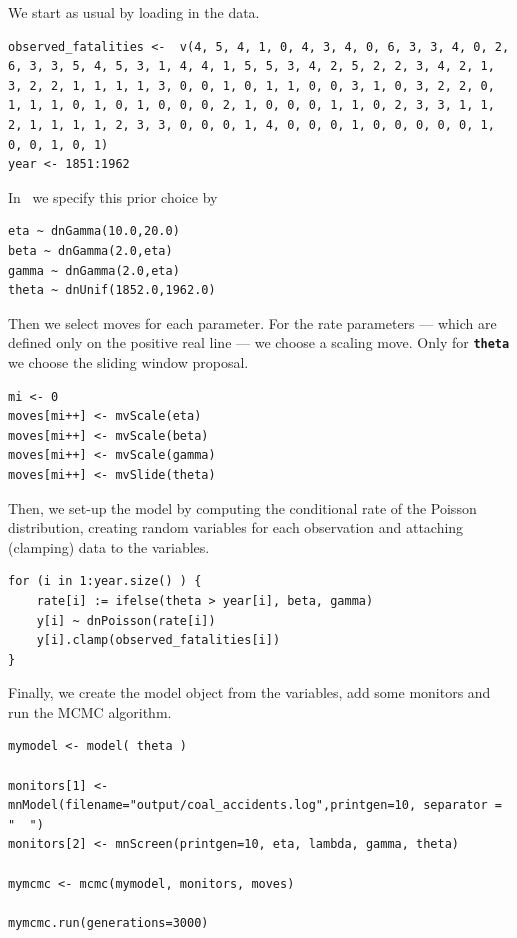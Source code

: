 \documentclass[11pt]{article}
\newcommand{\cl}[1]{{\texttt{\textbf{#1}}}}
\begin{document}
We start as usual by loading in the data.
{\tt \begin{snugshade*}
\begin{lstlisting} 
observed_fatalities <-  v(4, 5, 4, 1, 0, 4, 3, 4, 0, 6, 3, 3, 4, 0, 2, 6, 3, 3, 5, 4, 5, 3, 1, 4, 4, 1, 5, 5, 3, 4, 2, 5, 2, 2, 3, 4, 2, 1, 3, 2, 2, 1, 1, 1, 1, 3, 0, 0, 1, 0, 1, 1, 0, 0, 3, 1, 0, 3, 2, 2, 0, 1, 1, 1, 0, 1, 0, 1, 0, 0, 0, 2, 1, 0, 0, 0, 1, 1, 0, 2, 3, 3, 1, 1, 2, 1, 1, 1, 1, 2, 3, 3, 0, 0, 0, 1, 4, 0, 0, 0, 1, 0, 0, 0, 0, 0, 1, 0, 0, 1, 0, 1)
year <- 1851:1962
\end{lstlisting}
\end{snugshade*}}
In \Rev~we specify this prior choice by
{\tt \begin{snugshade*}
\begin{lstlisting} 
eta ~ dnGamma(10.0,20.0)
beta ~ dnGamma(2.0,eta)
gamma ~ dnGamma(2.0,eta)
theta ~ dnUnif(1852.0,1962.0)
\end{lstlisting}
\end{snugshade*}}
Then we select moves for each parameter.
For the rate parameters --- which are defined only on the positive real line --- we choose a scaling move.
Only for \cl{theta} we choose the sliding window proposal.
{\tt \begin{snugshade*}
\begin{lstlisting} 
mi <- 0
moves[mi++] <- mvScale(eta)
moves[mi++] <- mvScale(beta)
moves[mi++] <- mvScale(gamma)
moves[mi++] <- mvSlide(theta)
\end{lstlisting}
\end{snugshade*}}
Then, we set-up the model by computing the conditional rate of the Poisson distribution, creating random variables for each observation and attaching (clamping) data to the variables.
{\tt \begin{snugshade*}
\begin{lstlisting} 
for (i in 1:year.size() ) {
    rate[i] := ifelse(theta > year[i], beta, gamma)
    y[i] ~ dnPoisson(rate[i])
    y[i].clamp(observed_fatalities[i])
}
\end{lstlisting}
\end{snugshade*}}
Finally, we create the model object from the variables, add some monitors and run the MCMC algorithm.
{\tt \begin{snugshade*}
\begin{lstlisting} 
mymodel <- model( theta )

monitors[1] <- mnModel(filename="output/coal_accidents.log",printgen=10, separator = "	")
monitors[2] <- mnScreen(printgen=10, eta, lambda, gamma, theta)

mymcmc <- mcmc(mymodel, monitors, moves)

mymcmc.run(generations=3000)
\end{lstlisting}
\end{snugshade*}}
\end{document}
